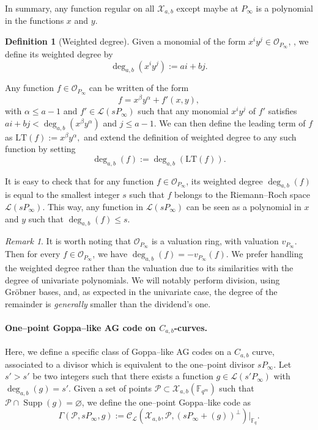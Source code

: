 \documentclass[a4paper]{article}
\theoremstyle{definition}
\newtheorem{definition}[thm]{Definition}
\theoremstyle{remark}
\newtheorem{remark}{Remark}
\newcommand{\calP}{\mathcal{P}}
\newcommand{\calL}{\mathcal{L}}
\newcommand{\calC}{\mathcal{C}}
\newcommand{\calO}{\mathcal{O}}
\newcommand{\calX}{\mathcal{X}}
\newcommand{\fq}{\mathbb{F}_{q}}
\newcommand{\F}{\mathbb{F}}
\newcommand{\Supp}{\operatorname{Supp}}
\newcommand{\degab}[1]{\deg_{a,b}\left(#1\right)}
\begin{document}
In summary, any function regular on all $\calX_{a,b}$ except maybe at $P_\infty$ is a polynomial in the functions $x$ and $y$. 

\begin{definition}[Weighted degree]
Given a monomial of the form $x^iy^j \in \calO_{P_\infty}$, , we define its weighted degree by
\[ \degab{x^iy^j} := ai+bj.\]

Any function $f \in \calO_{P_\infty}$ can be written of the form $$f = x^{\beta}y^{\alpha} + f'(x,y),$$
with $\alpha \leq a-1$ and $f' \in \calL(sP_{\infty})$ such that any monomial $x^iy^j$ of $f'$ satisfies $ai+bj < \degab{x^{\beta}y^{\alpha}}$ and $j \leq a-1$. We can then define the leading term of $f$ as $\mathrm{LT}(f) := x^{\beta}y^{\alpha},$ and extend the definition of weighted degree to any such function by setting 
\[\degab{f} := \degab{\mathrm{LT}(f)}.\]
\end{definition}

It is easy to check that for any function $f \in \calO_{P_\infty}$, its weighted degree $\degab{f}$ is equal to the smallest integer $s$ such that $f$ belongs to the Riemann--Roch space $\calL(sP_{\infty})$.
%
This way, any function in $\calL(sP_\infty)$ can be seen as a polynomial in $x$ and $y$ such that $\degab{f}\leq s$. 

\begin{remark}
It is worth noting that $\calO_{P_\infty}$ is a valuation ring, with valuation $v_{P_\infty}$. Then for every $f \in \calO_{P_\infty}$, we have $
\degab{f}=-v_{P_\infty}(f)$. We prefer handling the weighted degree rather than the valuation due to its similarities with the degree of univariate 
polynomials. We will notably perform division, using Gr\"obner bases, and, as expected in the univariate case, the degree of the remainder is 
\textit{generally} smaller than the dividend's one.
\end{remark}

\paragraph{One--point Goppa--like AG code on $C_{a,b}$-curves.}

Here, we define a specific class of Goppa--like AG codes on a $C_{a,b}$ curve, associated to a divisor which is equivalent to the one--point divisor $sP_\infty$.
Let $s'>s'$ be two integers such that there exists a function $g \in \calL(s'P_\infty)$ with $\degab{g}=s'$. Given a set of points  $\calP \subset \calX_{a,b}(\F_{q^m})$ such that $\calP \cap \Supp(g) = \varnothing$, we define the one--point Goppa--like code as 
\[\Gamma(\calP,sP_\infty,g) := \calC_{\calL}(\calX_{a,b},\calP,(sP_\infty+(g))^{\perp})|_{\fq}.\]
\end{document}
